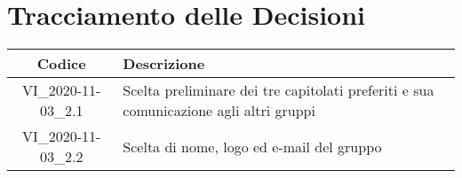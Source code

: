 \section*{Tracciamento delle Decisioni}

\begin{center}
	\begin{longtable}{|c|p{13cm}|}
	\hline
	\rowcolor{lighter-grayer}
	\textbf{Codice} & \textbf{Descrizione} \\
	\hline
	\endfirsthead

	\hline
	VI\_2020-11-03\_2.1 & Scelta preliminare dei tre capitolati preferiti e sua comunicazione agli altri gruppi \\
	\hline
	VI\_2020-11-03\_2.2 & Scelta di nome, logo ed e-mail del gruppo\\
	\hline

	\end{longtable}
\end{center}